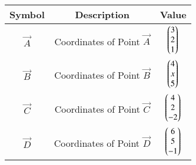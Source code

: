 \begin{tabular}[12pt]{ |c|c|c|}
    \hline
    \textbf{Symbol} & \textbf{Description} & \textbf{Value} \\
    \hline
    $\vec{A}$ & Coordinates of Point $\vec{A}$ & $\begin{pmatrix}3\\2\\1\end{pmatrix}$ \\
    \hline
    $\vec{B}$ & Coordinates of Point $\vec{B}$ & $\begin{pmatrix}4\\x\\5\end{pmatrix}$ \\
    \hline
    $\vec{C}$ & Coordinates of Point $\vec{C}$ & $\begin{pmatrix}4\\2\\-2\end{pmatrix}$ \\
    \hline
    $\vec{D}$ & Coordinates of Point $\vec{D}$ & $\begin{pmatrix}6\\5\\-1\end{pmatrix}$ \\
    \hline
\end{tabular}
